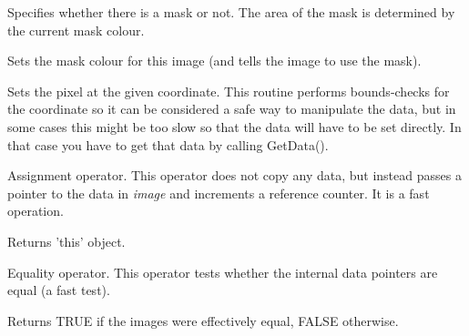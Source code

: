 \label{wximagesetmask}


Specifies whether there is a mask or not. The area of the mask is determined by the current mask colour.

\label{wximagesetmaskcolour}


Sets the mask colour for this image (and tells the image to use the mask).

\label{wximagesetrgb}


Sets the pixel at the given coordinate. This routine performs bounds-checks
for the coordinate so it can be considered a safe way to manipulate the
data, but in some cases this might be too slow so that the data will have to
be set directly. In that case you have to get that data by calling GetData().



Assignment operator. This operator does not copy any data, but instead
passes a pointer to the data in {\it image} and increments a reference
counter. It is a fast operation.




Returns 'this' object.



Equality operator. This operator tests whether the internal data pointers are
equal (a fast test).




Returns TRUE if the images were effectively equal, FALSE otherwise.

